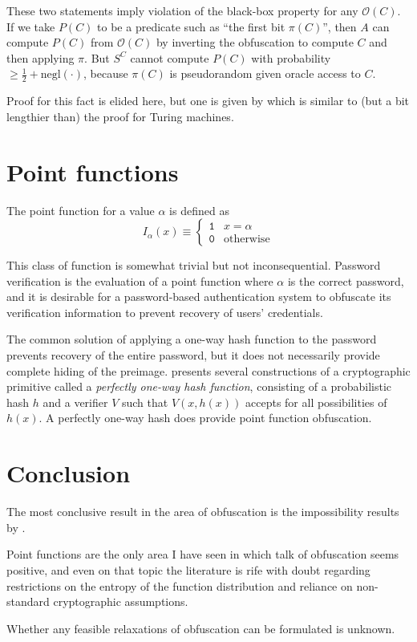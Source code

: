 \documentclass[10pt,twocolumn]{article}
\def\zero{\texttt{0}}
\def\one{\texttt{1}}
\def\obf{\ensuremath{\mathcal{O}}}
\def\negl{\text{negl}}
\begin{document}
    These two statements imply violation of the black-box property for any $\obf(C)$.
    If we take $P(C)$ to be a predicate such as ``the first bit $\pi(C)$'',
    then $A$ can compute $P(C)$ from $\obf(C)$ by inverting the obfuscation to compute $C$ and then applying $\pi$.
    But $S^C$ cannot compute $P(C)$ with probability $\ge \frac{1}{2}+\negl(\cdot)$,
    because $\pi(C)$ is pseudorandom given oracle access to $C$.

    Proof for this fact is elided here, but one is given by \cite{onThe(Im)possibility}
    which is similar to (but a bit lengthier than) the proof for Turing machines.

  \section{Point functions}

    The point function for a value $\alpha$ is defined as
    \[ I_\alpha(x) \equiv \begin{cases} \one & x=\alpha \\ \zero & \text{otherwise} \end{cases} \]

    This class of function is somewhat trivial but not inconsequential.
    Password verification is the evaluation of a point function where $\alpha$ is the correct password,
    and it is desirable for a password-based authentication system to obfuscate its verification
    information to prevent recovery of users' credentials.

    The common solution of applying a one-way hash function to the password prevents recovery of the
    entire password, but it does not necessarily provide complete hiding of the preimage.
    \cite{perfectlyOneWay} presents several constructions of a cryptographic primitive called a
    \textit{perfectly one-way hash function}, consisting of a probabilistic hash $h$ and a verifier
    $V$ such that $V(x, h(x))$ accepts for all possibilities of $h(x)$.
    A perfectly one-way hash does provide point function obfuscation.

  \section{Conclusion}

    The most conclusive result in the area of obfuscation is the impossibility results by
    \cite{onThe(Im)possibility}.

    Point functions are the only area I have seen in which talk of obfuscation seems positive,
    and even on that topic the literature is rife with doubt regarding restrictions on the
    entropy of the function distribution and reliance on non-standard cryptographic assumptions.

    Whether any feasible relaxations of obfuscation can be formulated is unknown.

  

  
\end{document}
